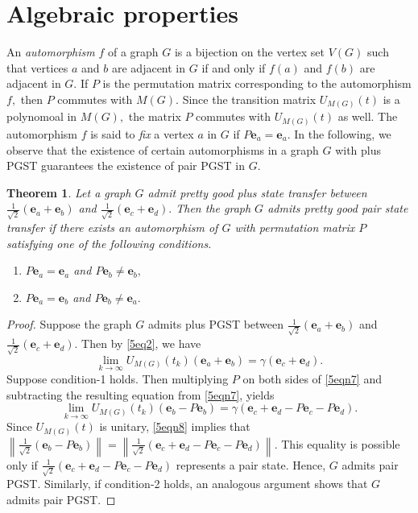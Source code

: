 \documentclass[12pt,a4paper]{article}
\newtheorem{thm}{Theorem}
\def \e {{\bf e}}
\def \e {{\mathbf e}}
\newcommand{\ob}[1]{\left(#1\right)}
\begin{document}
\section{Algebraic properties}\label{5s2}
An \emph{automorphism} $f$ of a graph $G$ is a bijection on the vertex set $V(G)$ such that vertices 
$a$ and $b$ are adjacent in $G$ if and only if  $f(a)$ and $f(b)$ are adjacent in $G.$
 If $P$ is the permutation matrix corresponding to the automorphism $f,$ then $P$ commutes with $M(G).$  Since the transition matrix $U_{M(G)}(t)$ is a polynomoal in $M(G),$ the matrix $P$ commutes with $U_{M(G)}(t)$ as well. The automorphism $f$ is said to \emph{fix} a vertex $a$ in $G$ if $P\e_a=\e_a.$ 
 In the following, we observe that the existence of certain automorphisms in a graph $G$ with plus PGST guarantees the existence of pair PGST in $G.$
\begin{thm}\label{5l7}
 Let a graph $G$ admit pretty good plus state transfer between $\frac{1}{\sqrt{2}}\ob{\e_a+\e_b}$ and $\frac{1}{\sqrt{2}}\ob{\e_c+\e_d}.$ Then the graph $G$ admits pretty good pair state transfer if there exists an automorphism of $G$ with  permutation matrix 
 $P$ satisfying one of the following conditions.
 \begin{enumerate}
    \item $P\e_a=\e_a$ and $P\e_b\neq \e_b,$ 
    \item  $P\e_a=\e_b$ and $P\e_b\neq \e_a.$ 
\end{enumerate}
 \end{thm}
 \begin{proof}
  Suppose the graph $G$ admits plus PGST between $\frac{1}{\sqrt{2}}\ob{\e_a+\e_b}$ and $\frac{1}{\sqrt{2}}\ob{\e_c+\e_d}.$ Then by \eqref{5eq2}, we have 
  \begin{equation}\label{5eqn7}
         \lim_{k \to \infty}U_{M(G)}\ob{t_k}\ob{\e_a+\e_b}=\gamma\ob{\e_c+\e_d}.
     \end{equation}
    Suppose condition-1 holds. Then
     multiplying $P$ on both sides of \eqref{5eqn7} and subtracting the resulting equation from \eqref{5eqn7}, yields
 \begin{equation}\label{5eqn8}
        \lim_{k \to \infty}U_{M(G)}\ob{t_k}\ob{\e_b-P\e_b}=\gamma\ob{\e_c+\e_d-P\e_c-P\e_d}.
   \end{equation}
    Since $U_{M(G)}(t)$ is unitary, \eqref{5eqn8} implies that $\left\|\frac{1}{\sqrt{2}}\ob{\e_b-P\e_b}\right\|=\left\|\frac{1}{\sqrt{2}}\ob{\e_c+\e_d-P\e_c-P\e_d}\right\|.$ This equality is possible only if $\frac{1}{\sqrt{2}}\ob{\e_c+\e_d-P\e_c-P\e_d}$ represents a pair state. Hence, $G$ admits pair PGST.  
    Similarly, if condition-2 holds, an analogous argument shows that  
    $G$ admits pair PGST.
 \end{proof}
\end{document}
